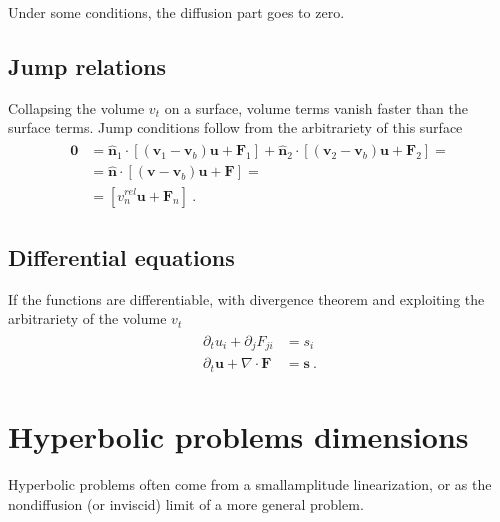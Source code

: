 \documentclass[letterpaper,10pt,english]{jupyterBook}
\begin{document}
\sphinxAtStartPar
Under some conditions, the diffusion part goes to zero.


\subsection{Jump relations}
\label{\detokenize{ch/pde/hyperbolic-intro:jump-relations}}\label{\detokenize{ch/pde/hyperbolic-intro:pde-hyperbolic-intro-jump}}
\sphinxAtStartPar
Collapsing the volume \(v_t\) on a surface, volume terms vanish faster than the surface terms. Jump conditions follow from the arbitrariety of this surface
\begin{equation*}
\begin{split}\begin{aligned}
  \mathbf{0}
  & = \hat{\mathbf{n}}_1 \cdot \left[ (\mathbf{v}_1-\mathbf{v}_b) \mathbf{u} + \mathbf{F}_1 \right] 
    + \hat{\mathbf{n}}_2 \cdot \left[ (\mathbf{v}_2-\mathbf{v}_b) \mathbf{u} + \mathbf{F}_2 \right] = \\
  & = \hat{\mathbf{n}}   \cdot \left[ (\mathbf{v}-\mathbf{v}_b) \mathbf{u} + \mathbf{F} \right] = \\
  & = \left[ v_n^{rel} \mathbf{u} + \mathbf{F}_n \right] \ .
\end{aligned}\end{split}
\end{equation*}

\subsection{Differential equations}
\label{\detokenize{ch/pde/hyperbolic-intro:differential-equations}}\label{\detokenize{ch/pde/hyperbolic-intro:pde-hyperbolic-intro-differential}}
\sphinxAtStartPar
If the functions are differentiable, with divergence theorem and exploiting the arbitrariety of the volume \(v_t\)
\begin{equation*}
\begin{split}\begin{aligned}
  \partial_t u_i + \partial_j F_{ji} & = s_i \\
  \partial_t \mathbf{u} + \nabla \cdot \mathbf{F} & = \mathbf{s} \ .
\end{aligned}\end{split}
\end{equation*}
\sphinxstepscope


\section{Hyperbolic problems \sphinxhyphen{} dimensions}
\label{\detokenize{ch/pde/hyperbolic-dimensions:hyperbolic-problems-dimensions}}\label{\detokenize{ch/pde/hyperbolic-dimensions:pde-hyperbolic-dimensions}}\label{\detokenize{ch/pde/hyperbolic-dimensions::doc}}
\sphinxAtStartPar
Hyperbolic problems often come from a small\sphinxhyphen{}amplitude linearization, or as the non\sphinxhyphen{}diffusion (or inviscid) limit of a more general problem.
\end{document}
